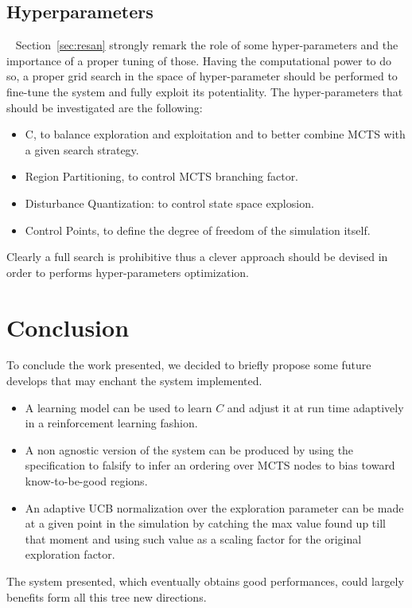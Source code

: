 \documentclass[11pt]{article}
\begin{document}
\subsection{Hyperparameters}~\label{sec:hp}
Section~\ref{sec:resan} strongly remark the role of some hyper-parameters and the importance of a proper tuning of those.
Having the computational power to do so, a proper grid search in the space of hyper-parameter should be performed to fine-tune the system and fully exploit its potentiality.
The hyper-parameters that should be investigated are the following:
\begin{itemize}
    \item C, to balance exploration and exploitation and to better combine MCTS with a given search strategy.
    \item Region Partitioning, to control MCTS branching factor.
    \item Disturbance Quantization: to control state space explosion.
    \item Control Points, to define the degree of freedom of the simulation itself.
\end{itemize}
Clearly a full search is prohibitive thus a clever approach should be devised in order to performs hyper-parameters optimization.

\section{Conclusion}
To conclude the work presented, we decided to briefly propose some future develops that may enchant the system implemented.
\begin{itemize}
    \item A learning model can be used to learn $C$ and adjust it at run time adaptively in a reinforcement learning fashion. 
    \item A non agnostic version of the system can be produced by using the specification to falsify to infer an ordering over MCTS nodes to bias toward know-to-be-good regions.
    \item An adaptive UCB normalization over the exploration parameter can be made at a given point in the simulation by catching the max value found up till that moment and using such value as a scaling factor for the original exploration factor.
\end{itemize}

The system presented, which eventually obtains good performances, could largely benefits form all this tree new directions.




\end{document}
